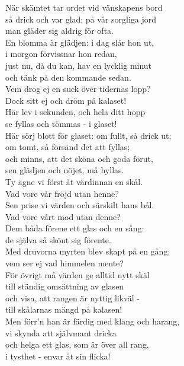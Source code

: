 \documentclass[a6paper, 10pt, twoside]{article}
\begin{document}
\noindent
\begin{center}
\end{center}
\vspace{-8pt}
\begin{lyrics}
När skämtet tar ordet vid vänskapens bord\\
så drick och var glad: på vår sorgliga jord\\
man gläder sig aldrig för ofta.\\
En blomma är glädjen: i dag slår hon ut,\\
i morgon förvissnar hon redan,\\
just nu, då du kan, hav en lycklig minut\\
och tänk på den kommande sedan.
\vspace{4pt}\\
Vem drog ej en suck över tidernas lopp?\\
Dock sitt ej och dröm på kalaset!\\
Här lev i sekunden, och hela ditt hopp\\
se fyllas och tömmas - i glaset!\\
Här sörj blott för glaset: om fullt, så drick ut;\\
om tomt, så försänd det att fyllas;\\
och minns, att det sköna och goda förut,\\
sen glädjen och nöjet, må hyllas.
\vspace{4pt}\\
Ty ägne vi först åt värdinnan en skål.\\
Vad vore vår fröjd utan henne?\\
Sen prise vi värden och särskilt hans bål.\\
Vad vore vårt mod utan denne?\\
Dem båda förene ett glas och en sång:\\
de själva så skönt sig förente.\\
Med druvorna myrten blev skapt på en gång:\\
vem ser ej vad himmelen mente?
\vspace{4pt}\\
För övrigt må värden ge alltid nytt skäl\\
till ständig omsättning av glasen\\
och visa, att rangen är nyttig likväl -\\
till skålarnas mängd på kalasen!\\
Men förr'n han är färdig med klang och harang,\\
vi skynda att självmant dricka\\
och helga ett glas, som är över all rang,\\
i tysthet - envar åt sin flicka!\\
\end{lyrics}   
\end{document}
